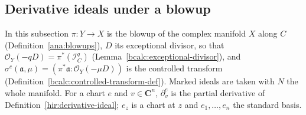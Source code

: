 \subsection{Derivative ideals under a blowup}

In this subsection \(\pi\colon Y\to X\) is the blowup of the complex manifold \(X\) along \(C\)
(Definition~\ref{ana:blowups}), \(D\) its exceptional divisor, so that \(\mathcal O_Y(-qD)=\pi^*(\mathcal I_C^q)\)
(Lemma~\ref{bcalc:exceptional-divisor}), and \(\sigma^c(\mathfrak a,\mu)=(\pi^*\mathfrak a:\mathcal O_Y(-\mu D))\) is the
controlled transform (Definition~\ref{bcalc:controlled-transform-def}). Marked ideals are taken with \(N\) the whole
manifold. For a chart \(e\) and \(v\in\mathbf C^n\), \(\partial^e_v\) is the partial derivative of
Definition~\ref{hir:derivative-ideal}; \(e_z\) is a chart at \(z\) and \(e_1,\dots,e_n\) the standard basis.

